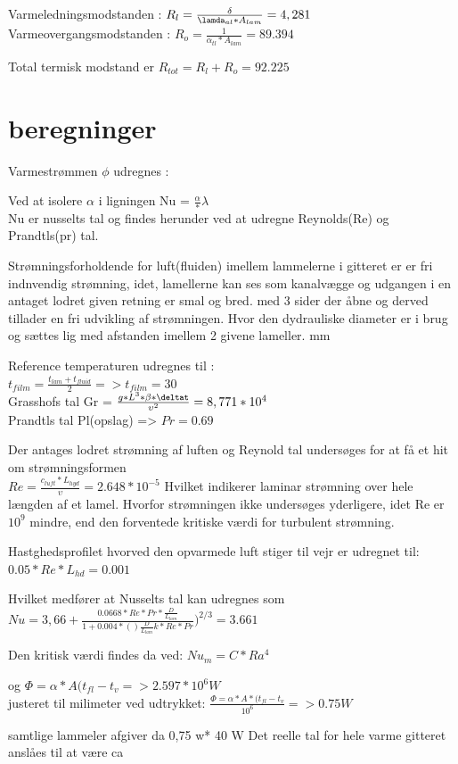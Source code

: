 Varmeledningsmodstanden : $R_l = \frac{\delta}{\lamda_{al}*A_{lam}} = 4,281$
Varmeovergangsmodstanden : $R_o = \frac{1}{\alpha_{tl}*A_{lam}} = 89.394$

Total termisk modstand er $R_{tot} = R_l + R_o = 92.225$

\section{beregninger}

Varmestrømmen $\phi$ udregnes : 

Ved at isolere $\alpha$ i ligningen Nu = $\frac{\alpha}*{\lambda}$ \\
Nu er nusselts tal og findes herunder ved at udregne Reynolds(Re) og Prandtls(pr) tal.


Strømningsforholdende for luft(fluiden) imellem lammelerne i gitteret er er fri indnvendig strømning, idet, lamellerne kan ses som kanalvægge og udgangen i en antaget lodret given retning er smal og bred. med 3 sider der åbne og derved tillader en fri udvikling af strømningen. Hvor den dydrauliske diameter er i brug og sættes lig med afstanden imellem 2 givene lameller.  mm

Reference temperaturen udregnes til : 
\\$t_{film} = \frac{{t_{lam}}+t_{fluid}}{2} => t_{film}=30$
\\Grasshofs tal Gr = $\frac{g*L^3*\beta*{\deltat}}{\upsilon^2} = 8,771*10^4$
\\Prandtls tal Pl(opslag) => $Pr=0.69$


Der antages lodret  strømning af luften og Reynold tal undersøges for at få et hit om strømningsformen\\

$Re = \frac{c_{luft}*L_{hyd}}{\upsilon} = 2.648*10^{-5}$
Hvilket indikerer laminar strømning over hele længden af et lamel. Hvorfor strømningen ikke undersøges yderligere, idet Re er $10^9$ mindre, end den forventede kritiske værdi for turbulent strømning.

Hastghedsprofilet hvorved den opvarmede luft stiger til vejr er udregnet til: 
$0.05*Re*L_{hd} = 0.001 $

Hvilket medfører at Nusselts tal kan udregnes som \\ 
$Nu = 3,66+ \frac{0.0668*Re*Pr*\frac{D}{L_{lam}}}{1+0.004*()\frac{D}{L_{lam}}k *Re*Pr})^{2/3} = 3.661$


Den kritisk værdi findes da ved: $Nu_m = C*Ra^4$

og $ \Phi = \alpha*A(t_{fl}-t_v =>2.597*10^6 W $\\ 
justeret til milimeter ved udtrykket: $\frac{\Phi = \alpha*A*(t_{fl}-t_v}{10^6} =>0.75 W$

samtlige lammeler afgiver da 0,75 w* 40  W 
Det reelle tal for hele varme gitteret anslåes til at være ca